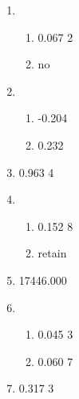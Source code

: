 \documentclass[12pt]{article}
\newcommand{\exnum}[9]{
  #1#2#3#4#5#6.#7#8#9\ignorespaces%
}
\newcommand{\exstring}[1]{
  #1%
}
\begin{document}
\begin{enumerate}









\end{enumerate}

\newpage

\begin{enumerate}
  \item 
   \begin{enumerate}
      \item \exnum{ }{ }{ }{ }{ }{0}{0}{6}{7}{2}
      \item \exstring{no} 
  \end{enumerate}
  \item 
   \begin{enumerate}
      \item \exnum{ }{ }{ }{ }{-}{0}{2}{0}{4}
      \item \exnum{ }{ }{ }{ }{ }{0}{2}{3}{2} 
  \end{enumerate}
  \item \exnum{ }{ }{ }{ }{ }{0}{9}{6}{3}{4}
  \item 
   \begin{enumerate}
      \item \exnum{ }{ }{ }{ }{ }{0}{1}{5}{2}{8}
      \item \exstring{retain} 
  \end{enumerate}
  \item \exnum{ }{1}{7}{4}{4}{6}{0}{0}{0}
  \item 
   \begin{enumerate}
      \item \exnum{ }{ }{ }{ }{ }{0}{0}{4}{5}{3}
      \item \exnum{ }{ }{ }{ }{ }{0}{0}{6}{0}{7} 
  \end{enumerate}
  \item \exnum{ }{ }{ }{ }{ }{0}{3}{1}{7}{3}
\end{enumerate}
\end{document}

